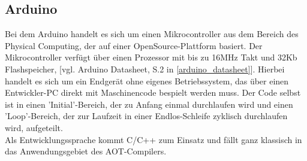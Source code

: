 \subsection{Arduino}
Bei dem Arduino handelt es sich um einen Mikrocontroller aus dem Bereich des Physical Computing, der auf einer OpenSource-Plattform basiert. Der Mikrocontroller verfügt über einen Prozessor mit bis zu 16MHz Takt und 32Kb Flashspeicher, [vgl. Arduino Datasheet, S.2 in \autoref{arduino_datasheet}]. Hierbei handelt es sich um ein Endgerät ohne eigenes Betriebssystem, das über einen Entwickler-PC direkt mit Maschinencode bespielt werden muss. Der Code selbst ist in einen 'Initial'-Bereich, der zu Anfang einmal durchlaufen wird und einen 'Loop'-Bereich, der zur Laufzeit in einer Endlos-Schleife zyklisch durchlaufen wird, aufgeteilt.\\
Als Entwicklungssprache kommt C/C++ zum Einsatz und fällt ganz klassisch in das Anwendungsgebiet des \ac{AOT}-Compilers.